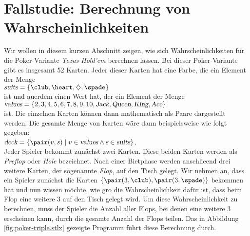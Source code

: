 \section{Fallstudie: Berechnung von Wahrscheinlichkeiten}
Wir wollen in diesem kurzen Abschnitt zeigen, wie sich Wahrscheinlichkeiten f\"{u}r die Poker-Variante
\textsl{Texas Hold'em} berechnen lassen.  Bei dieser Poker-Variante gibt es insgesamt 52 Karten. Jeder
dieser Karten hat eine Farbe, die ein Element der Menge
\\[0.2cm]
\hspace*{1.3cm} $\textsl{suits} = \{ \club, \heart, \diamondsuit, \spade \}$
\\[0.2cm]
ist und au\3erdem einen Wert hat, der ein Element der Menge
\\[0.2cm]
\hspace*{1.3cm} $\textsl{values} = \{ 2, 3, 4, 5, 6, 7, 8, 9, 10, \textsl{Jack}, \textsl{Queen},
\textsl{King}, \textsl{Ace} \}$
\\[0.2cm]
ist.  Die einzelnen Karten k\"{o}nnen dann mathematisch als Paare dargestellt werden.  Die gesamte Menge von
Karten w\"{a}re dann beispielsweise wie folgt gegeben:
\\[0.2cm]
\hspace*{1.3cm} 
$\textsl{deck} = \{ \pair(v,s) \mid v \in \textsl{values} \wedge \textsl{s} \in \textsl{suits} \}$.
\\[0.2cm]
Jeder Spieler bekommt zun\"{a}chst zwei Karten.  Diese beiden Karten werden als \emph{Preflop}
oder \emph{Hole} bezeichnet.  Nach einer Bietphase werden anschlie\3end drei weitere
Karten, der sogenannte \textsl{Flop}, auf den Tisch gelegt.  Wir nehmen an, dass ein Spieler zun\"{a}chst die
Karten $\{ \pair(3, \club), \pair(3, \spade) \}$ bekommen hat und nun wissen m\"{o}chte, wie gro\3 die
Wahrscheinlichkeit daf\"{u}r ist, dass beim Flop eine weitere 3 auf den Tisch gelegt wird.
Um diese Wahrscheinlichkeit zu berechnen, muss der Spieler die Anzahl aller Flops, bei denen eine weitere
3 erscheinen kann, durch die gesamte Anzahl der Flops teilen.  Das in Abbildung \ref{fig:poker-triple.stlx}
gezeigte Programm f\"{u}hrt diese Berechnung durch.

